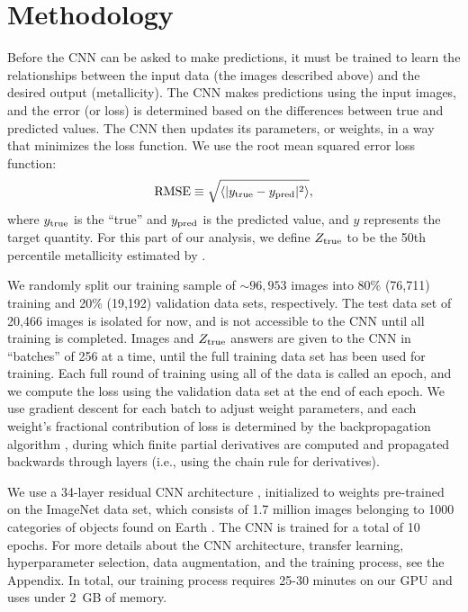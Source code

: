 \documentclass[fleqn,usenatbib]{mnras}
\begin{document}
\section{Methodology}\label{sec:training}
Before the CNN can be asked to make predictions, it must be trained to learn the relationships between the input data (the images described above) and the desired output (metallicity). The CNN makes predictions using the input images, and the error (or loss) is determined based on the differences between true and predicted values. The CNN then updates its parameters, or weights, in a way that minimizes the loss function. We use the root mean squared error loss function:
\begin{equation}
\mathrm{RMSE} \equiv \sqrt{\langle |y_{\rm true} - y_{\rm pred}|^2\rangle},
\end{equation}
where $y_{\rm true}$ is the ``true'' and $y_{\rm pred}$ is the predicted value, and $y$ represents the target quantity. For this part of our analysis, we define $Z_{\rm true}$ to be the 50th percentile metallicity estimated by \cite{Tremonti2004}.

We randomly split our training sample of $\sim 96,953$ images into 80\% (76,711) training and 20\% (19,192) validation data sets, respectively. The test data set of 20,466 images is isolated for now, and is not accessible to the CNN until all training is completed. Images and $Z_{\rm true}$ answers are given to the CNN in ``batches'' of 256 at a time, until the full training data set has been used for training. Each full round of training using all of the data is called an epoch, and we compute the loss using the validation data set at the end of each epoch.
We use gradient descent for each batch to adjust weight parameters, and each weight's fractional contribution of loss is determined by the backpropagation algorithm \citep{LeCun1989}, during which finite partial derivatives are computed and propagated backwards through layers (i.e., using the chain rule for derivatives).

We use a 34-layer residual CNN architecture \citep{He2015}, initialized to weights pre-trained on the ImageNet data set, which consists of 1.7 million images belonging to 1000 categories of objects found on Earth \citep[e.g., cats, horses, cars, or books;][]{ImageNet}.
The CNN is trained for a total of 10 epochs.
For more details about the CNN architecture, transfer learning, hyperparameter selection, data augmentation, and the training process, see the Appendix.
In total, our training process requires 25-30 minutes on our GPU and uses under 2~GB of memory.
\end{document}
